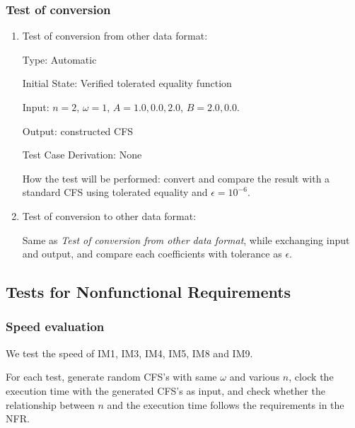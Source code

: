 \documentclass[12pt, titlepage]{article}
\begin{document}
\subsubsection{Test of conversion}

\begin{enumerate}
	\item{Test of conversion from other data format:\\}
	
	Type: Automatic
	
	Initial State: Verified tolerated equality function
	
	Input: $n=2$, $\omega=1$, $A={1.0, 0.0, 2.0}$, $B={2.0, 0.0}$.
	
	Output: constructed CFS
	
	Test Case Derivation: None
	
	How the test will be performed: convert and compare the result with a standard CFS using tolerated equality and $\epsilon=10^{-6}$.
	
	\item{Test of conversion to other data format:\\}
	
	Same as \textit{Test of conversion from other data format}, while exchanging input and output, and compare each coefficients with tolerance as $\epsilon$.
	
\end{enumerate}

\subsection{Tests for Nonfunctional Requirements}


\subsubsection{Speed evaluation}
We test the speed of IM1, IM3, IM4, IM5, IM8 and IM9.	

For each test, generate random CFS's with same $\omega$ and various $n$, clock the execution time with the generated CFS's as input, and check whether the relationship between $n$ and the execution time follows the requirements in the NFR. 		
\end{document}
